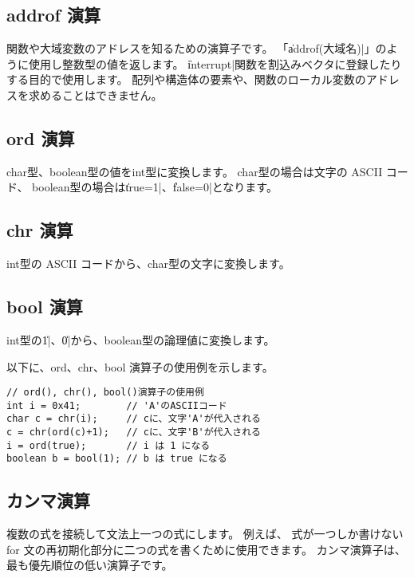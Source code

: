 \subsection{addrof 演算}
\label{chap3:addrof}

関数や大域変数のアドレスを知るための演算子です。
「\|addrof(大域名)|」のように使用し整数型の値を返します。
\|interrupt|関数を割込みベクタに登録したりする目的で使用します。
配列や構造体の要素や、関数のローカル変数のアドレスを求めることはできません。

\subsection{ord 演算}
\label{chap3:ord}

char型、boolean型の値をint型に変換します。
char型の場合は文字の ASCII コード、
boolean型の場合は\|true=1|、\|false=0|となります。

\subsection{chr 演算}
\label{chap3:chr}

int型の ASCII コードから、char型の文字に変換します。

\subsection{bool 演算}
\label{chap3:bool}

int型の\|1|、\|0|から、boolean型の論理値に変換します。

以下に、ord、chr、bool 演算子の使用例を示します。

\begin{mylist}
\begin{verbatim}
// ord(), chr(), bool()演算子の使用例
int i = 0x41;        // 'A'のASCIIコード
char c = chr(i);     // cに、文字'A'が代入される
c = chr(ord(c)+1);   // cに、文字'B'が代入される
i = ord(true);       // i は 1 になる
boolean b = bool(1); // b は true になる
\end{verbatim}
\end{mylist}

\subsection{カンマ演算}
複数の式を接続して文法上一つの式にします。
例えば、
式が一つしか書けない for 文の再初期化部分に二つの式を書くために使用できます。
カンマ演算子は、最も優先順位の低い演算子です。

